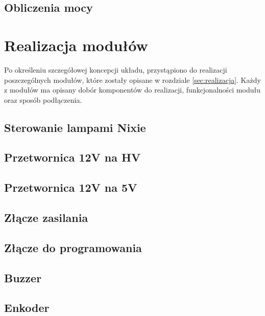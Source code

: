 \documentclass[twoside]{article}
\begin{document}
\subsection{Obliczenia mocy}

\newpage

\section{Realizacja modułów}
Po określeniu szczegółowej koncepcji układu, przystąpiono do realizacji poszczególnych modułów, które zostały opisane w rozdziale \ref{sec:realizacja}.
Każdy z modułów ma opisany dobór komponentów do realizacji, funkcjonalności modułu oraz sposób podłączenia.

\subsection{Sterowanie lampami Nixie}

\newpage

\subsection{Przetwornica 12V na HV}

\newpage

\subsection{Przetwornica 12V na 5V}

\newpage

\subsection{Złącze zasilania}

\newpage

\subsection{Złącze do programowania}
\label{sec:usb_c_to_program}

\newpage

\subsection{Buzzer}

\newpage

\subsection{Enkoder}

\newpage
\end{document}
